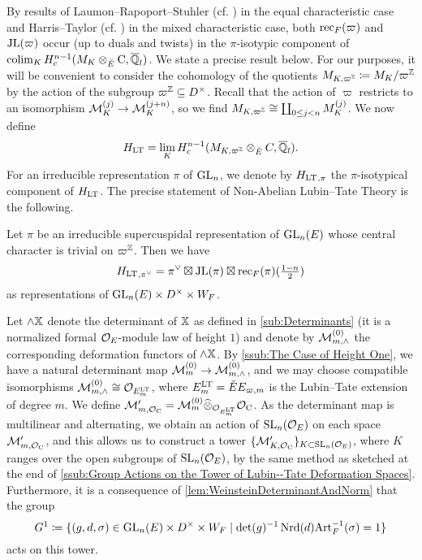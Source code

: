 \documentclass[../main.tex]{subfiles}
\begin{document}
By results of Laumon--Rapoport--Stuhler (cf. \cite{laumon1993elliptic})
in the equal characteristic case and Harris--Taylor (cf. \cite{HTShimura}) in the 
mixed characteristic case, both $\mathrm{rec}_F(\varpi)$ and $\mathrm{JL}(\varpi)$ occur
(up to duals and twists) in the $\pi$-isotypic component of 
$\operatorname*{colim}_K H^{n-1}_c (M_{K} \otimes_{{\breve {E}}} {\mathrm{C}}, \overline {\mathbb{Q}}_l)$. We state a
precise result below.
For our purposes, it will be convenient to consider the cohomology of the 
quotients $M_{K, \varpi^{\mathbb{Z}}} \coloneqq M_K/\varpi^{\mathbb{Z}}$ by the action of the
subgroup $\varpi^{\mathbb{Z}} \subseteq D^\times$. Recall that the action of 
$\varpi$ restricts to an isomorphism $\mathcal{M}_K^{(j)} \to \mathcal{M}_K^{(j+n)}$, so we find
$M_{K, \varpi^{\mathbb{Z}}} \cong \coprod_{0 \leq j < n} M_{K}^{(j)}$. We now define
\begin{equation} \label{eq:defHLT}
  H_{\mathrm{LT}} = \lim_{K} H^{n-1}_c (M_{K, \varpi^{\mathbb{Z}}} \otimes_{{\breve {E}}} C, \overline {\mathbb{Q}}_l).
\end{equation}
For an irreducible representation $\pi$ of $\operatorname{GL}_n$, we denote by ${H_{\mathrm{LT}}}_{,\pi}$ the 
$\pi$-isotypical component of $H_{\mathrm{LT}}$.
The precise statement of Non-Abelian Lubin--Tate Theory is the following.
\begin{thm}\label{thm:NonAbLTT}
  Let $\pi$ be an irreducible supercuspidal representation of $\operatorname{GL}_n(E)$ whose central
  character is trivial on $\varpi^{\mathbb{Z}}$.   
  Then we have 
  \begin{equation*}
    {H_{\mathrm{LT}}}_{,\pi^\vee} = \pi^\vee \boxtimes \mathrm{JL}(\pi) \boxtimes \mathrm{rec}_F(\pi)(\tfrac{1-n}2)
  \end{equation*}
  as representations of $\operatorname{GL}_n(E) \times D^\times \times W_F$. 
\end{thm}

Let $\wedge \mathbb{X}$ denote the determinant of $\mathbb{X}$ as defined in 
\cref{sub:Determinants} (it is a normalized formal $\mathcal{O}_E$-module law of height
$1$) and denote by $\mathcal{M}_{m, \wedge}^{(0)}$ the corresponding deformation
functors of $\wedge \mathbb{X}$. 
By \cref{ssub:The Case of Height One}, we have a natural
determinant map $\mathcal{M}_{m}^{(0)} \to \mathcal{M}_{m ,\wedge}^{(0)}$, and we may choose compatible
isomorphisms $\mathcal{M}_{m, \wedge}^{(0)} \cong \mathcal{O}_{E^{\mathrm{LT}}_m}$, where $E^{\mathrm{LT}}_m = {\breve {E}} 
E_{\varpi, m}$ is the Lubin--Tate extension of degree $m$. 
We define $\mathcal{M}'_{m,\mathcal{O}_{\mathrm{C}}} = \mathcal{M}_{m}^{(0)} \widehat \otimes_{\mathcal{O}_{E^{\mathrm{LT}}_m}} \mathcal{O}_{\mathrm{C}}$.
As the determinant map is multilinear and alternating, we obtain an action of 
$\operatorname{SL}_n(\mathcal{O}_E)$ on each space $\mathcal{M}'_{m,\mathcal{O}_{\mathrm{C}}}$, and this allows us to construct a tower
$\{\mathcal{M}'_{K, \mathcal{O}_{\mathrm{C}}}\}_{K \subset \operatorname{SL}_n(\mathcal{O}_E)}$, where $K$ ranges over the 
open subgroups of $\operatorname{SL}_n(\mathcal{O}_E)$, by the same method as sketched 
at the end of \cref{ssub:Group Actions on the Tower of Lubin--Tate Deformation
Spaces}. Furthermore, it is a consequence of \cref{lem:WeinsteinDeterminantAndNorm}
that the group 
\begin{equation}\label{eq:DefGandG1}
  G^1 \coloneqq \{(g,d,\sigma) \in \operatorname{GL}_n(E) \times D^\times \times W_F \mid 
  \det(g)^{-1} \operatorname{Nrd}(d) \mathrm{Art}_F^{-1}(\sigma) = 1\}
\end{equation}
acts on this tower.
\end{document}

